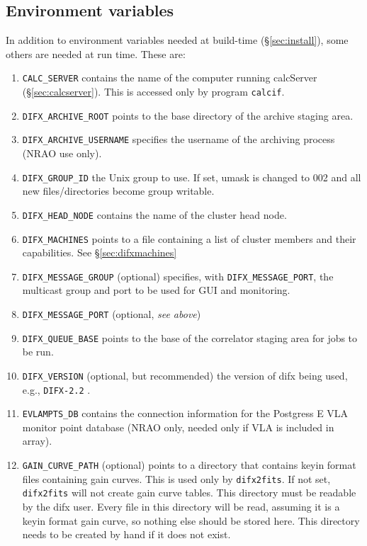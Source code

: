 \subsection{Environment variables} \label{sec:env}

In addition to environment variables needed at build-time (\S\ref{sec:install}), some others are needed at run time.
These are:
\begin{enumerate}
\item {\tt CALC\_SERVER} contains the name of the computer running calcServer (\S\ref{sec:calcserver}).
This is accessed only by program {\tt calcif}.
\item {\tt DIFX\_ARCHIVE\_ROOT} points to the base directory of the archive staging area.
\item {\tt DIFX\_ARCHIVE\_USERNAME} specifies the username of the archiving process (NRAO use only).
\item {\tt DIFX\_GROUP\_ID} the Unix group to use.  If set, umask is changed to 002 and all new files/directories become group writable.
\item {\tt DIFX\_HEAD\_NODE} contains the name of the cluster head node.
\item {\tt DIFX\_MACHINES} points to a file containing a list of cluster members and their capabilities.
See \S\ref{sec:difxmachines}
\item {\tt DIFX\_MESSAGE\_GROUP} (optional) specifies, with {\tt DIFX\_MESSAGE\_PORT}, the multicast group and port to be used for GUI and monitoring.
\item {\tt DIFX\_MESSAGE\_PORT} (optional, {\em see above})
\item {\tt DIFX\_QUEUE\_BASE} points to the base of the correlator staging area for jobs to be run.
\item {\tt DIFX\_VERSION} (optional, but recommended) the version of difx being used, e.g., {\tt DIFX-2.2} .
\item {\tt EVLAMPTS\_DB} contains the connection information for the Postgress E
VLA monitor point database (NRAO only, needed only if VLA is included in array).
\item {\tt GAIN\_CURVE\_PATH} (optional) points to a directory that contains keyin format files containing gain curves.
This is used only by {\tt difx2fits}.
If not set, {\tt difx2fits} will not create gain curve tables.
This directory must be readable by the difx user.
Every file in this directory will be read, assuming it is a keyin format gain curve, so nothing else should be stored here.
This directory needs to be created by hand if it does not exist.

\end{enumerate}
